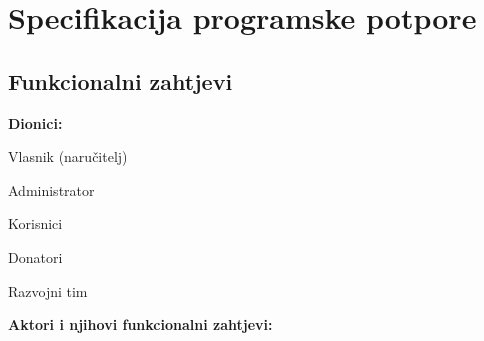 \chapter{Specifikacija programske potpore}
		
	\section{Funkcionalni zahtjevi}

					
			\noindent \textbf{Dionici:}
			
			\begin{packed_enum}
				
				\item Vlasnik (naručitelj)
				\item Administrator
				\item Korisnici			
				\item Donatori
				\item Razvojni tim
				
			\end{packed_enum}
			
			\noindent \textbf{Aktori i njihovi funkcionalni zahtjevi:}
			
